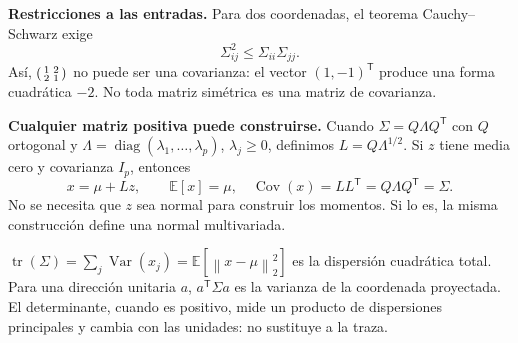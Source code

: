 \documentclass[11pt,a4paper]{article}
\newcommand{\E}{\mathbb E}
\newcommand{\T}{^{\mathsf T}}
\newcommand{\norm}[1]{\left\lVert #1\right\rVert}
\DeclareMathOperator{\Var}{Var}
\DeclareMathOperator{\Cov}{Cov}
\DeclareMathOperator{\tr}{tr}
\DeclareMathOperator{\diag}{diag}
\theoremstyle{definition}\newtheorem{definicion}[teorema]{Definición}
\begin{document}
\textbf{Restricciones a las entradas.} Para dos coordenadas, el teorema
Cauchy--Schwarz exige
\[
\Sigma_{ij}^2\le\Sigma_{ii}\Sigma_{jj}.
\]
Así, $\begin{psmallmatrix}1&2\\2&1\end{psmallmatrix}$ no puede ser una
covarianza: el vector $(1,-1)\T$ produce una forma cuadrática $-2$.
No toda matriz simétrica es una matriz de covarianza.

\textbf{Cualquier matriz positiva puede construirse.}
Cuando $\Sigma=Q\Lambda Q\T$ con $Q$ ortogonal y
$\Lambda=\diag(\lambda_1,\ldots,\lambda_p)$, $\lambda_j\ge0$, definimos
$L=Q\Lambda^{1/2}$. Si $z$ tiene media cero y covarianza $I_p$, entonces
\[
x=\mu+Lz,\qquad
\E[x]=\mu,\quad \Cov(x)=LL\T=Q\Lambda Q\T=\Sigma.
\]
No se necesita que $z$ sea normal para construir los momentos. Si lo es,
la misma construcción define una normal multivariada.

\begin{idea}
$\tr(\Sigma)=\sum_j\Var(x_j)=\E[\norm{x-\mu}_2^2]$ es la dispersión
cuadrática total. Para una dirección unitaria $a$, $a\T\Sigma a$ es
la varianza de la coordenada proyectada. El determinante, cuando es
positivo, mide un producto de dispersiones principales y cambia con las
unidades: no sustituye a la traza.
\end{idea}
\end{document}
